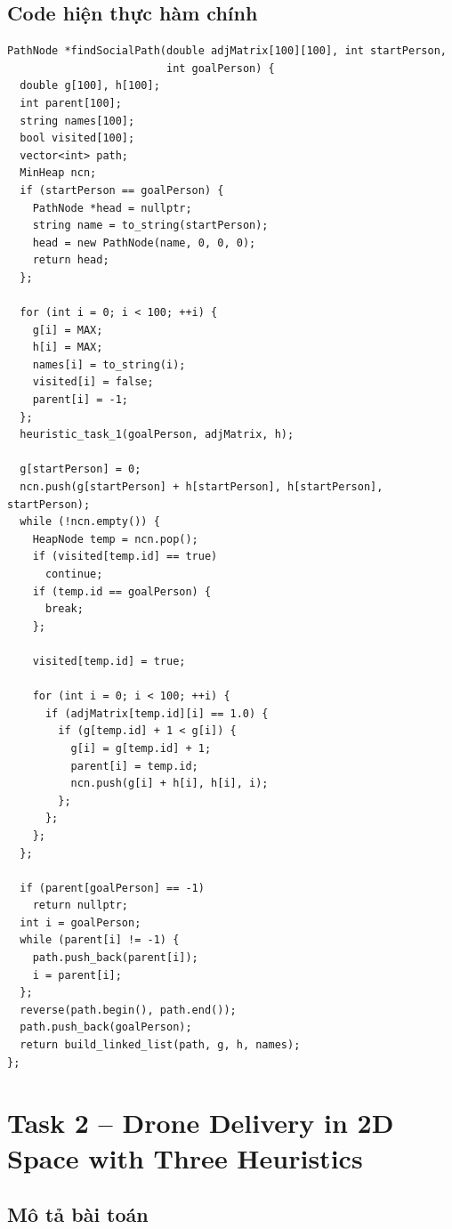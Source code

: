 \documentclass[13pt,a4paper]{article}
\begin{document}
\subsection{Code hiện thực hàm chính}
\begin{lstlisting}[caption={Hàm findSocialPath trong Algo.cpp}]
PathNode *findSocialPath(double adjMatrix[100][100], int startPerson,
                         int goalPerson) {
  double g[100], h[100];
  int parent[100];
  string names[100];
  bool visited[100];
  vector<int> path;
  MinHeap ncn;
  if (startPerson == goalPerson) {
    PathNode *head = nullptr;
    string name = to_string(startPerson);
    head = new PathNode(name, 0, 0, 0);
    return head;
  };

  for (int i = 0; i < 100; ++i) {
    g[i] = MAX;
    h[i] = MAX;
    names[i] = to_string(i);
    visited[i] = false;
    parent[i] = -1;
  };
  heuristic_task_1(goalPerson, adjMatrix, h);

  g[startPerson] = 0;
  ncn.push(g[startPerson] + h[startPerson], h[startPerson], startPerson);
  while (!ncn.empty()) {
    HeapNode temp = ncn.pop();
    if (visited[temp.id] == true)
      continue;
    if (temp.id == goalPerson) {
      break;
    };

    visited[temp.id] = true;

    for (int i = 0; i < 100; ++i) {
      if (adjMatrix[temp.id][i] == 1.0) {
        if (g[temp.id] + 1 < g[i]) {
          g[i] = g[temp.id] + 1;
          parent[i] = temp.id;
          ncn.push(g[i] + h[i], h[i], i);
        };
      };
    };
  };

  if (parent[goalPerson] == -1)
    return nullptr;
  int i = goalPerson;
  while (parent[i] != -1) {
    path.push_back(parent[i]);
    i = parent[i];
  };
  reverse(path.begin(), path.end());
  path.push_back(goalPerson);
  return build_linked_list(path, g, h, names);
};
\end{lstlisting}

\newpage

\section{Task 2 -- Drone Delivery in 2D Space with Three Heuristics}

\subsection{Mô tả bài toán}
\end{document}
